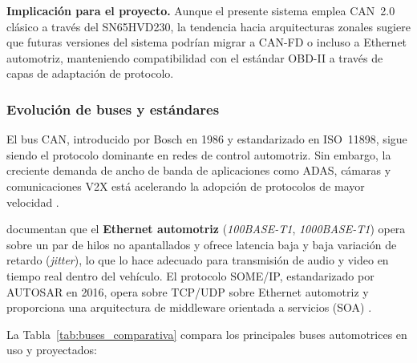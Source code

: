 \noindent\textbf{Implicación para el proyecto.}
Aunque el presente sistema emplea CAN~2.0 clásico a través
del SN65HVD230, la tendencia hacia arquitecturas zonales sugiere
que futuras versiones del sistema podrían migrar a CAN-FD o
incluso a Ethernet automotriz, manteniendo compatibilidad con
el estándar OBD-II a través de capas de adaptación de
protocolo.

\subsubsection{Evolución de buses y estándares}

El bus CAN, introducido por Bosch en 1986 y estandarizado en
ISO~11898, sigue siendo el protocolo dominante en redes de
control automotriz.  Sin embargo, la creciente demanda de
ancho de banda de aplicaciones como ADAS, cámaras y
comunicaciones V2X está acelerando la adopción de protocolos
de mayor velocidad \citep{Springer_EEArch2024}.

\citet{Springer_EEArch2024} documentan que el
\textbf{Ethernet automotriz} (\textit{100BASE-T1},
\textit{1000BASE-T1}) opera sobre un par de hilos no
apantallados y ofrece latencia baja y baja variación de
retardo (\textit{jitter}), lo que lo hace adecuado para
transmisión de audio y video en tiempo real dentro del
vehículo.  El protocolo SOME/IP, estandarizado por AUTOSAR en
2016, opera sobre TCP/UDP sobre Ethernet automotriz y
proporciona una arquitectura de middleware orientada a
servicios (SOA) \citep{Springer_EEArch2024}.

La Tabla~\ref{tab:buses_comparativa} compara los principales
buses automotrices en uso y proyectados:

